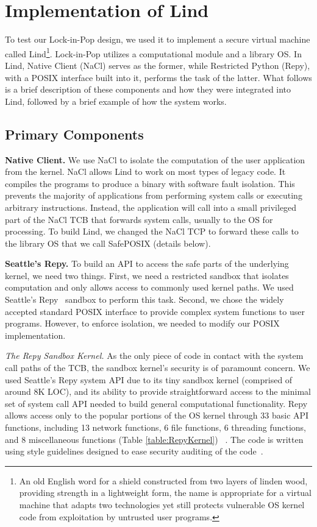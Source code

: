 \section{Implementation of Lind}
\label{sec.implementation}

To test our Lock-in-Pop design, we used it to implement a secure virtual machine
called Lind\footnote{\scriptsize An old English word for a shield constructed from two layers of
linden wood, providing strength in a lightweight form, the name is appropriate for
a virtual machine that adapts two technologies\textendash
yet still protects vulnerable OS kernel code from exploitation by
untrusted user programs.}.
Lock-in-Pop utilizes a
computational module and a library OS. In Lind, Native Client (NaCl) serves as the former,
while Restricted Python (Repy), with a POSIX interface built into it, performs the
task of the latter.
What follows is a brief description of these components and how they were integrated
into Lind, followed by a brief example of how the system works.

\subsection{Primary Components}

\textbf{Native Client.}
We use NaCl to isolate the computation of the user application
from the kernel. NaCl allows Lind to work on most types of legacy code.
It compiles the programs to produce a binary with software fault isolation.
This prevents the majority of applications from performing system calls
or executing arbitrary instructions.
Instead, the application will call into a small privileged
part of the NaCl TCB that forwards system calls, usually to the OS for
processing. To build Lind, we changed the NaCl TCP to
forward these calls to the library OS that we call SafePOSIX (details below).

\textbf{Seattle's Repy.}
To build an API to access the safe parts of the underlying kernel, we need
two things. First, we need a restricted sandbox that isolates computation
and only allows access to commonly used kernel paths.  We used
Seattle's Repy~\cite{Repy-10} sandbox to perform this task.
Second, we chose the widely accepted standard POSIX interface to
provide complex system functions to user programs. However, to enforce isolation,
we needed to modify our POSIX implementation.

\textit{The Repy Sandbox Kernel.}
As the only piece of code in contact with the system call paths of the TCB,
the sandbox kernel's security is of paramount concern.
We used Seattle's Repy system API due to its tiny sandbox kernel
(comprised of around 8K LOC), and its ability to provide straightforward
access to the minimal set of system call API needed to build general
computational functionality. Repy allows
access only to the popular portions of the OS kernel through 33 basic API
functions, including 13 network functions, 6 file functions, 6 threading functions,
and 8 miscellaneous functions (Table \ref{table:RepyKernel}) 
~\cite{Repy-10, RepyKernel}. 
The code is written using style guidelines designed to ease security auditing 
of the code~\cite{style}.

